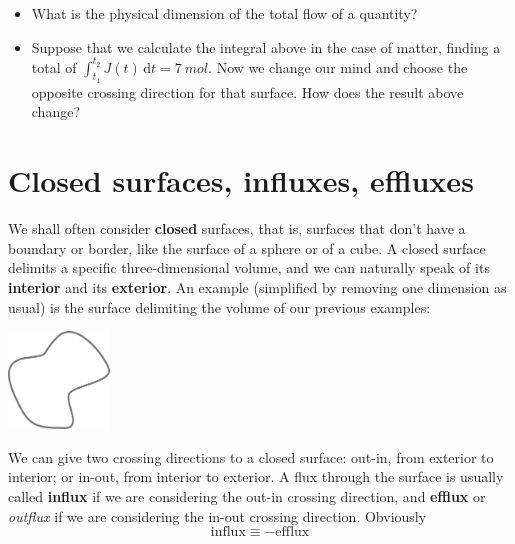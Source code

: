 \documentclass[a4paper,12pt,%
onecolumn,oneside,titlepage,%
british%
]{memoir}
\newcommand*{\di}{\mathrm{d}}%
\renewcommand*{\|}[1][]{\nonscript\:#1\vert\nonscript\:\mathopen{}}
\newcommand*{\yJ}{J}
\begin{document}
\smallskip

\begin{exercise}
  \begin{itemize}[shift]
  \item What is the physical dimension of the total flow of a quantity?
  \item Suppose that we calculate the integral above in the case of matter, finding a total of $\int_{t_{1}}^{t_{2}}\!\! \yJ(t)\,\di t = \qty{7}{mol}$. Now we change our mind and choose the opposite crossing direction for that surface. How does the result above change?
  \end{itemize}
\end{exercise}


\section{Closed surfaces, influxes, effluxes}
\label{sec:in_out_flux}

We shall often consider \textbf{closed} surfaces, that is, surfaces that don't have a boundary or border, like the surface of a sphere or of a cube. A closed surface delimits a specific three-dimensional volume, and we can naturally speak of its \textbf{interior} and its \textbf{exterior}. An example (simplified by removing one dimension as usual) is the surface delimiting the volume of our previous examples:
\begin{center}
  \includegraphics[height=7em]{closed_surface.pdf}
\end{center}

We can give two crossing directions to a closed surface: out-in, from exterior to interior; or in-out, from interior to exterior. A flux through the surface is usually called \textbf{influx} if we are considering the out-in crossing direction, and \textbf{efflux} or \emph{outflux} if we are considering the in-out crossing direction. Obviously
\begin{equation*}
  \text{influx} \equiv -\text{efflux}
\end{equation*}

\end{document}
